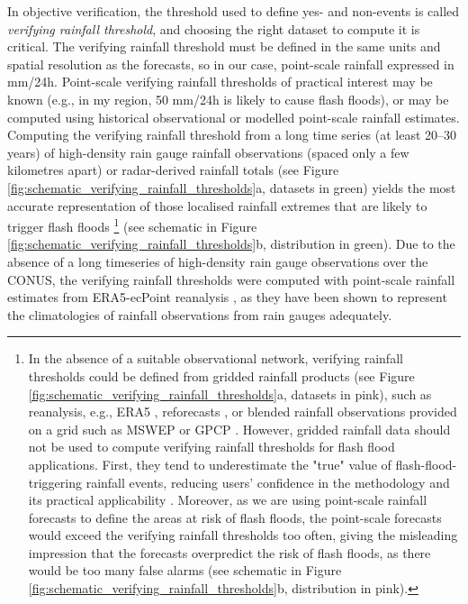 In  objective verification, the threshold used to define yes- and non-events is called \textit{verifying rainfall threshold}, and choosing the right dataset to compute it is critical. The verifying rainfall threshold must be defined in the same units and spatial resolution as the forecasts, so in our case, point-scale rainfall expressed in mm/24h. Point-scale verifying rainfall thresholds of practical interest may be known (e.g., in my region, 50 mm/24h is likely to cause flash floods), or may be computed using historical observational or modelled point-scale rainfall estimates. Computing the verifying rainfall threshold from a long time series (at least 20–30 years) of high-density rain gauge rainfall observations (spaced only a few kilometres apart) or radar-derived rainfall totals (see Figure \ref{fig:schematic_verifying_rainfall_thresholds}a, datasets in green) yields the most accurate representation of those localised rainfall extremes that are likely to trigger flash floods \citep{Haiden_2016, RamosFilho_2021}\footnote{In the absence of a suitable observational network, verifying rainfall thresholds could be defined from gridded rainfall products (see Figure \ref{fig:schematic_verifying_rainfall_thresholds}a, datasets in pink), such as reanalysis, e.g., ERA5 \citep{Hersbach_2020}, reforecasts \citep{Hamill_2006b}, or blended rainfall observations provided on a grid such as MSWEP \citep{Beck_2019} or GPCP \citep{Adler_2018}. However, gridded rainfall data should not be used to compute verifying rainfall thresholds for flash flood applications. First, they tend to underestimate the "true" value of flash-flood-triggering rainfall events, reducing users' confidence in the methodology and its practical applicability \citep{Tapiador_2019}. Moreover, as we are using point-scale rainfall forecasts to define the areas at risk of flash floods, the point-scale forecasts would exceed the verifying rainfall thresholds too often, giving the misleading impression that the forecasts overpredict the risk of flash floods, as there would be too many false alarms (see schematic in Figure \ref{fig:schematic_verifying_rainfall_thresholds}b, distribution in pink).} (see schematic in Figure \ref{fig:schematic_verifying_rainfall_thresholds}b, distribution in green). Due to the absence of a long timeseries of high-density rain gauge observations over the CONUS, the verifying rainfall thresholds were computed with point-scale rainfall estimates from ERA5-ecPoint reanalysis \citep{Bottazzi_2024}, as they have been shown to represent the climatologies of rainfall observations from rain gauges \citep{Pillosu_2025a} adequately. 

